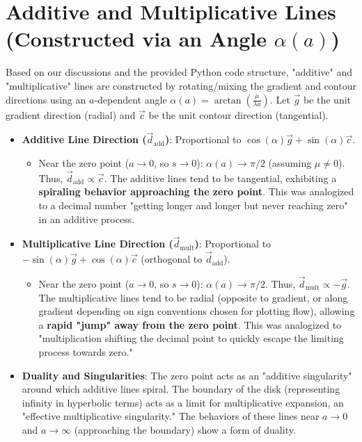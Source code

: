 \documentclass[12pt]{article}
\begin{document}
\section{Additive and Multiplicative Lines (Constructed via an Angle $\alpha(a)$)}
Based on our discussions and the provided Python code structure, "additive" and "multiplicative" lines are constructed by rotating/mixing the gradient and contour directions using an $a$-dependent angle $\alpha(a) = \arctan\left(\frac{\mu}{\lambda a}\right)$.
Let $\vec{g}$ be the unit gradient direction (radial) and $\vec{c}$ be the unit contour direction (tangential).
\begin{itemize}
    \item \textbf{Additive Line Direction ($\vec{d}_{\text{add}}$)}: Proportional to $\cos(\alpha) \vec{g} + \sin(\alpha) \vec{c}$.
    \begin{itemize}
        \item Near the zero point ($a \to 0$, so $s \to 0$): $\alpha(a) \to \pi/2$ (assuming $\mu \neq 0$). Thus, $\vec{d}_{\text{add}} \propto \vec{c}$. The additive lines tend to be tangential, exhibiting a \textbf{spiraling behavior approaching the zero point}. This was analogized to a decimal number "getting longer and longer but never reaching zero" in an additive process.
    \end{itemize}
    \item \textbf{Multiplicative Line Direction ($\vec{d}_{\text{mult}}$)}: Proportional to $-\sin(\alpha) \vec{g} + \cos(\alpha) \vec{c}$ (orthogonal to $\vec{d}_{\text{add}}$).
    \begin{itemize}
        \item Near the zero point ($a \to 0$, so $s \to 0$): $\alpha(a) \to \pi/2$. Thus, $\vec{d}_{\text{mult}} \propto -\vec{g}$. The multiplicative lines tend to be radial (opposite to gradient, or along gradient depending on sign conventions chosen for plotting flow), allowing a \textbf{rapid "jump" away from the zero point}. This was analogized to "multiplication shifting the decimal point to quickly escape the limiting process towards zero."
    \end{itemize}
    \item \textbf{Duality and Singularities}:
        The zero point acts as an "additive singularity" around which additive lines spiral. The boundary of the disk (representing infinity in hyperbolic terms) acts as a limit for multiplicative expansion, an "effective multiplicative singularity." The behaviors of these lines near $a \to 0$ and $a \to \infty$ (approaching the boundary) show a form of duality.
\end{itemize}
\end{document}
